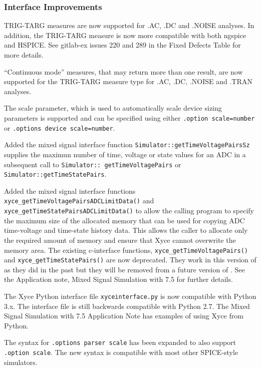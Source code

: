 \documentclass[letterpaper]{scrartcl}
\begin{document}
\subsubsection*{Interface Improvements}
\begin{XyceItemize}
  \item TRIG-TARG measures are now supported for .AC, .DC and .NOISE analyses.
In addition, the TRIG-TARG measure is now more compatible with both ngspice and
HSPICE.  See gitlab-ex issues 220 and 289 in the Fixed Defects Table
for more details.
  \item “Continuous mode” measures, that may return more than one result, are
now supported for the TRIG-TARG measure type for .AC, .DC, .NOISE and .TRAN
analyses.
  \item The scale parameter, which is used to automatically scale device sizing parameters 
    is supported and can be specified using either \texttt{.option scale=number} 
    or \texttt{.options device scale=number}.
  \item Added the mixed signal interface function
  \texttt{Simulator::getTimeVoltagePairsSz} supplies the maximun number of time,
  voltage or state values for an ADC in a subsequent call to \texttt{Simulator::
  getTimeVoltagePairs} or \texttt{Simulator::getTimeStatePairs}.
  \item Added the mixed signal interface functions
  \texttt{xyce\_getTimeVoltagePairs\-ADCLimitData()} and 
  \texttt{xyce\-\_getTimeStatePairs\-ADCLimitData()} to allow the calling program 
  to specify the maximum size of the allocated memory that can be used for copying
  ADC time-voltage and time-state history data.  This allows the caller to allocate only the 
  required amount of memory and ensure that Xyce cannot overwrite the memory area.
  The existing c-interface functions, \texttt{xyce\_getTimeVoltagePairs()} and 
  \texttt{xyce\_getTimeStatePairs()} are now deprecated. They work in this version 
  of \Xyce{} as they did in the past but they will be removed from a future version of \Xyce{}.
  See the Application note, Mixed Signal Simulation with \Xyce{} 7.5 for further details.
  \item The Xyce Python interface file \texttt{xyce\-interface.py} is now 
  compatible with Python 3.x.  The interface file is still backwards compatible 
  with Python 2.7. The Mixed Signal Simulation with \Xyce{} 7.5 Application Note 
  has examples of using Xyce from Python.
\item The syntax for \texttt{.options parser scale} has been expanded to also 
      support \texttt{.option scale}.  The new syntax is compatible with most 
      other SPICE-style simulators.
\end{XyceItemize}
\end{document}
